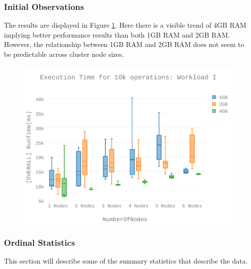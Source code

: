 \subsubsection{Initial Observations}
The results are displayed in Figure \ref{figures-wli_fig4}. Here there is a visible trend of 4GB RAM implying better performance results than both 1GB RAM and 2GB RAM.  However, the relationship between 1GB RAM and 2GB RAM does not seem to be predictable across cluster node sizes. \begin{figure}[h]
\includegraphics[width=5.5in]{Figures/figures-wli_fig4.pdf}
\caption{}
\label{figures-wli_fig4}
\end{figure}



\subsubsection{Ordinal Statistics}
This section will describe some of the summary statistics that describe the data.  

